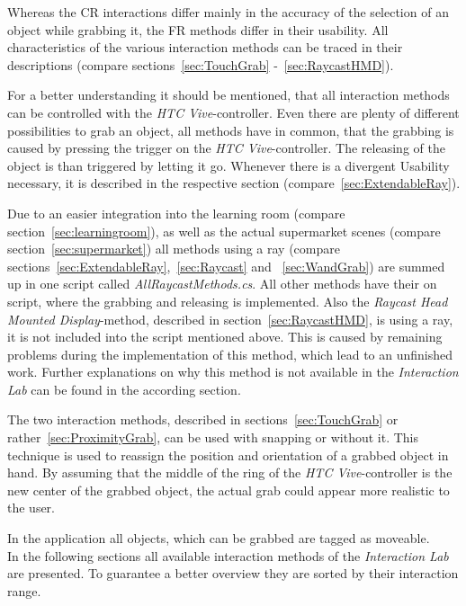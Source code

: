 Whereas the CR interactions differ mainly in the accuracy of the selection of an object while grabbing it, the FR methods differ in their usability. All characteristics of the various interaction methods can be traced in their descriptions (compare sections~\ref{sec:TouchGrab} -~\ref{sec:RaycastHMD}).

For a better understanding it should be mentioned, that all interaction methods can be controlled with the \textit{HTC Vive}-controller. Even there are plenty of different possibilities to grab an object, all methods have in common, that the grabbing is caused by pressing the trigger on the \textit{HTC Vive}-controller. The releasing of the object is than triggered by letting it go. Whenever there is a divergent Usability necessary, it is described in the respective section (compare~\ref{sec:ExtendableRay}).

Due to an easier integration into the learning room (compare section~\ref{sec:learningroom}), as well as the actual supermarket scenes (compare section~\ref{sec:supermarket}) all methods using a ray (compare sections~\ref{sec:ExtendableRay},~\ref{sec:Raycast} and ~\ref{sec:WandGrab}) are summed up in one script called \textit{AllRaycastMethods.cs}. All other methods have their on script, where the grabbing and releasing is implemented. Also the \textit{Raycast Head Mounted Display}-method, described in section~\ref{sec:RaycastHMD}, is using a ray, it is not included into the script mentioned above. This is caused by remaining problems during the implementation of this method, which lead to an unfinished work. Further explanations on why this method is not available in the \textit{Interaction Lab} can be found in the according section.

The two interaction methods, described in sections~\ref{sec:TouchGrab} or rather~\ref{sec:ProximityGrab}, can be used with snapping or without it. This technique is used to reassign the position and orientation of a grabbed object in hand. By assuming that the middle of the ring of the \textit{HTC Vive}-controller is the new center of the grabbed object, the actual grab could appear more realistic to the user. 

In the application all objects, which can be grabbed are tagged as moveable.\\

In the following sections all available interaction methods of the \textit{Interaction Lab} are presented. To guarantee a better overview they are sorted by their interaction range. 

